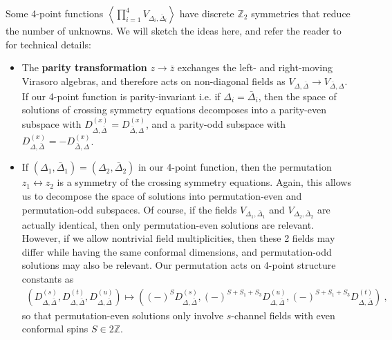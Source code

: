 \documentclass[12pt, a4paper]{article}
\newcommand{\myindex}[1]{\textbf{\boldmath #1}}
\begin{document}
Some 4-point functions $\left<\prod_{i=1}^4 V_{\Delta_i,\bar\Delta_i}\right>$ have discrete $\mathbb{Z}_2$ symmetries that reduce the number of unknowns. We will sketch the ideas here, and refer the reader to \cite[Section 2.4]{nrj23} for technical details:
\begin{itemize}
 \item The \myindex{parity transformation} $z\to \bar z$ exchanges the left- and right-moving Virasoro algebras, and therefore acts on non-diagonal fields as $V_{\Delta,\bar\Delta}\to V_{\bar\Delta,\Delta}$. If our 4-point function is parity-invariant i.e. if $\Delta_i=\bar\Delta_i$, then the space of solutions of crossing symmetry equations decomposes into a parity-even subspace with $D^{(x)}_{\Delta,\bar\Delta}=D^{(x)}_{\bar\Delta,\Delta}$, and a parity-odd subspace with $D^{(x)}_{\Delta,\bar\Delta}=-D^{(x)}_{\bar\Delta,\Delta}$. 
 \item If $(\Delta_1,\bar\Delta_1)=(\Delta_2,\bar\Delta_2)$ in our 4-point function, then 
the permutation $z_1\leftrightarrow z_2$ is a symmetry of the crossing symmetry equations. Again, this allows us to decompose the space of solutions into permutation-even and permutation-odd subspaces. Of course, if the fields $V_{\Delta_1,\bar\Delta_1}$ and $V_{\Delta_2,\bar\Delta_2}$ are actually identical, then only permutation-even solutions are relevant. However, if we allow nontrivial field multiplicities, then these 2 fields may differ while having the same conformal dimensions, and permutation-odd solutions may also be relevant.
Our permutation acts on 4-point structure constants as 
\begin{align}
\left(D^{(s)}_{\Delta,\bar\Delta},D^{(t)}_{\Delta,\bar\Delta},D^{(u)}_{\Delta,\bar\Delta}\right) \mapsto \left((-)^{S}D^{(s)}_{\Delta,\bar\Delta},(-)^{S+S_1+S_3}D^{(u)}_{\Delta,\bar\Delta},(-)^{S+S_1+S_3}D^{(t)}_{\Delta,\bar\Delta}\right)\ ,
\end{align}
so that permutation-even solutions only involve $s$-channel fields with even conformal spins $S\in 2\mathbb{Z}$. 
\end{itemize}
\end{document}
